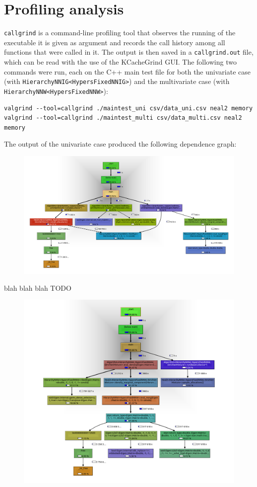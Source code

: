 \section{Profiling analysis}
\verb|callgrind| is a command-line profiling tool that observes the running of the executable it is given as argument and records the call history among all functions that were called in it.
The output is then saved in a \verb|callgrind.out| file, which can be read with the use of the KCacheGrind GUI.
The following two commands were run, each on the C++ main test file for both the univariate case (with \verb|HierarchyNNIG<HypersFixedNNIG>|) and the multivariate case (with \verb|HierarchyNNW<HypersFixedNNW>|):
\begin{verbatim}
valgrind --tool=callgrind ./maintest_uni csv/data_uni.csv neal2 memory
valgrind --tool=callgrind ./maintest_multi csv/data_multi.csv neal2 memory
\end{verbatim}
The output of the univariate case produced the following dependence graph:
\begin{figure}[h]
	\centering
		\includegraphics[scale=0.35]{etc/kcg_uni.png}
\end{figure}
blah blah blah TODO
\begin{figure}[h]
		\includegraphics[scale=0.35]{etc/kcg_multi.png}
\end{figure}
